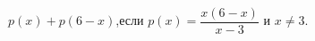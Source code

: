 \begin{ex}[type=calculate_expression]
	\begin{condition}
		\( p(x)+p(6-x) \),\quad если \( p(x)=\dfrac{x(6-x)}{x-3} \) и \( x\neq3 \).
	\end{condition}
\end{ex}